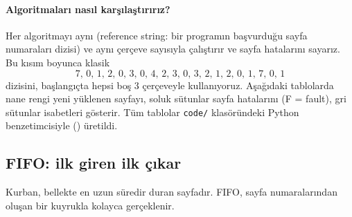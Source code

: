 \paragraph{Algoritmaları nasıl karşılaştırırız?} Her algoritmayı aynı  (reference string: bir programın başvurduğu sayfa numaraları dizisi) ve aynı çerçeve sayısıyla çalıştırır ve sayfa hatalarını sayarız. Bu kısım boyunca klasik
\[
7,\,0,\,1,\,2,\,0,\,3,\,0,\,4,\,2,\,3,\,0,\,3,\,2,\,1,\,2,\,0,\,1,\,7,\,0,\,1
\]
dizisini, başlangıçta hepsi boş $3$ çerçeveyle kullanıyoruz. Aşağıdaki tablolarda nane rengi yeni yüklenen sayfayı, soluk sütunlar sayfa hatalarını (F = fault), gri sütunlar isabetleri gösterir. Tüm tablolar \texttt{code/} klasöründeki Python benzetimcisiyle () üretildi.

\subsection{FIFO: ilk giren ilk çıkar}

Kurban, bellekte en uzun süredir duran sayfadır. FIFO, sayfa numaralarından oluşan bir kuyrukla kolayca gerçeklenir.

